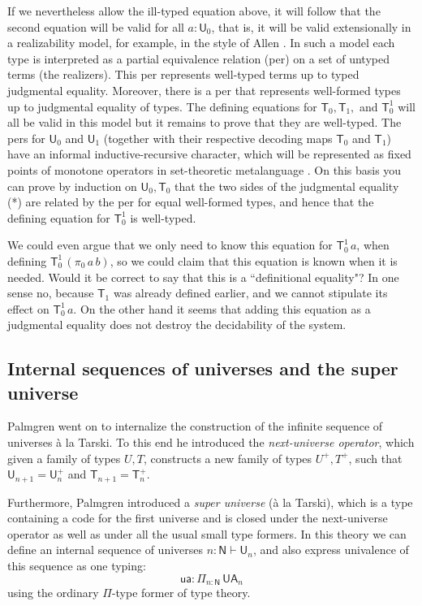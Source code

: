 \documentclass[11pt,a4paper]{article}
\def\NN{\mathsf{N}}
\def\UU{\mathsf{U}}
\newcommand{\N}{\mathsf{N}}
\newcommand{\T}{\mathsf{T}}
\newcommand{\ua}{\mathsf{ua}}
\newcommand{\UA}{\mathsf{UA}}
\begin{document}
If we nevertheless allow the ill-typed equation above, it will follow that the second equation will be valid for all $a : \UU_0$, that is, it will be valid extensionally in a realizability model, for example, in the style of Allen \cite{allen}. In such a model each type is interpreted as a partial equivalence relation (per) on a set of untyped terms (the realizers). This per represents well-typed terms up to typed judgmental equality. Moreover, there is a per that represents well-formed types up to judgmental equality of types. The defining equations for $\T_0, \T_1,$ and $\T_0^1$ will all be valid in this model but it remains to prove that they are well-typed. The pers for $\UU_0$ and $\UU_1$ (together with their respective decoding maps $\T_0$ and  $\T_1$) have an informal inductive-recursive character, which will be represented as fixed points of monotone operators in set-theoretic metalanguage \cite{allen}. On this basis you can prove by induction on $\UU_0, \T_0$ that the two sides of the judgmental equality (*) are related by the per for equal well-formed types, and hence that the defining equation for $\T_0^1$ is well-typed.

We could even argue that we only need to know this equation for $\T_0^1\, a$, when defining $\T_0^1\, (\pi_0\,a\, b)$, so we could claim that this equation is known when it is needed. Would it be correct to say that this is a ``definitional equality"? In one sense no, because $\T_1$ was already defined earlier, and we cannot stipulate its effect on $\T_0^1\, a$. On the other hand it seems that adding this equation as a judgmental equality does not destroy the decidability of the system.

\subsection{Internal sequences of universes and the super universe}

Palmgren \cite{palmgren:venice} went on to internalize the construction of the infinite sequence of universes  \`a la Tarski. To this end he introduced the {\em next-universe operator}, which given a family of types $U, T$, constructs a new family of types $U^+, T^+$, such that $ \UU_{n+1} = \UU_n^+$ and $\T_{n+1} = \T_n^+$.

Furthermore, Palmgren introduced a {\em super universe} (\`a la Tarski), which is a type containing a code for the first universe and is closed under the next-universe operator as well as under all the usual small type formers. In this theory we can define an internal sequence of universes $n : \NN \vdash \UU_n$, and also express univalence of this sequence as one typing:
$$
\ua : \Pi_{n : \N}\, \UA_n
$$
using the ordinary $\Pi$-type former of type theory.
\end{document}
